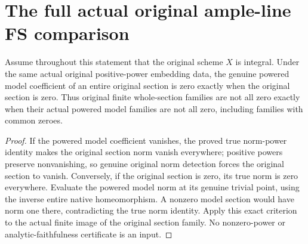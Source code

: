 \section{The full actual original ample-line FS comparison}
\label{sec:native-ample-model-fubini-study-comparison}

\begin{theorem}
\label{thm:native-ample-model-powered-section-nonzero}
\leanok
{}
Assume throughout this statement that the original scheme $X$ is integral.
Under the same actual original positive-power embedding data, the genuine
powered model coefficient of an entire original section is zero exactly when
the original section is zero. Thus original finite whole-section families are
not all zero exactly when their actual powered model families are not all zero,
including families with common zeroes.
\end{theorem}
\begin{proof}
If the powered model coefficient vanishes, the proved true norm-power identity
makes the original section norm vanish everywhere; positive powers preserve
nonvanishing, so genuine original norm detection forces the original section
to vanish. Conversely, if the original section is zero, its true norm is zero
everywhere. Evaluate the powered model norm at its genuine trivial point,
using the inverse entire native homeomorphism. A nonzero model section would
have norm one there, contradicting the true norm identity. Apply this exact
criterion to the actual finite image of the original section family. No
nonzero-power or analytic-faithfulness certificate is an input.
\end{proof}

